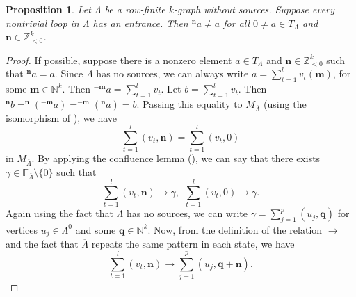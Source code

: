 \documentclass[a4paper,reqno,12pt]{amsart}
\numberwithin{equation}{section}
\newtheorem{prop}[thm]{Proposition}
\theoremstyle{definition}
\theoremstyle{remark}
\newcommand{\N}{\mathbf{n}}
\newcommand{\M}{\mathbf{m}}
\begin{document}
\begin{prop}\label{pro neccesary condition for loop with entrance}
Let $\Lambda$ be a row-finite $k$-graph without sources. Suppose every nontrivial loop in $\Lambda$ has an entrance. Then $^\N a\neq a$ for all $0\neq a\in T_\Lambda$ and $\N\in \mathbb{Z}_{<0}^k$.     
\end{prop}
\begin{proof}
If possible, suppose there is a nonzero element $a\in T_\Lambda$ and $\N\in \mathbb{Z}_{<0}^k$ such that $^\N a=a$. Since $\Lambda$ has no sources, we can always write $a=\displaystyle{\sum_{t=1}^{l}} v_t(\M)$, for some $\M\in \mathbb{N}^k$. Then $^{-\M}a=\displaystyle{\sum_{t=1}^{l}} v_t$. Let $b=\displaystyle{\sum_{t=1}^{l}} v_t$. Then $^\N b=^\N(^{-\M}a)=^{-\M}(^\N a)=b$. Passing this equality to $M_{\overline{\Lambda}}$ (using the isomorphism of \cite[Theorem 3.6 $(ii)$]{HMPS1}), we have \[\displaystyle{\sum_{t=1}^{l}} (v_t,\N)=\displaystyle{\sum_{t=1}^{l}} (v_t,0)\] in $M_{\overline{\Lambda}}$. By applying the confluence lemma (\cite[Lemma 3.5]{HMPS1}), we can say that there exists $\gamma\in \mathbb{F}_{\overline{\Lambda}} \setminus \{0\}$ such that \[\displaystyle{\sum_{t=1}^{l}} (v_t,\N)\longrightarrow \gamma,~~\displaystyle{\sum_{t=1}^{l}} (v_t,0)\longrightarrow \gamma.\] Again using the fact that $\Lambda$ has no sources, we can write $\gamma=\displaystyle{\sum_{j=1}^{p}} (u_j,\mathbf{q})$ for vertices $u_j\in \Lambda^0$ and some $\mathbf{q}\in \mathbb{N}^k$. Now, from the definition of the relation $\longrightarrow$ and the fact that $\overline{\Lambda}$ repeats the same pattern in each state, we have \
\begin{equation}\label{eq transition}
\displaystyle{\sum_{t=1}^{l}} (v_t,\N)\longrightarrow \displaystyle{\sum_{j=1}^{p}} (u_j,\mathbf{q}+\N).    
\end{equation}

\end{proof}
\end{document}
